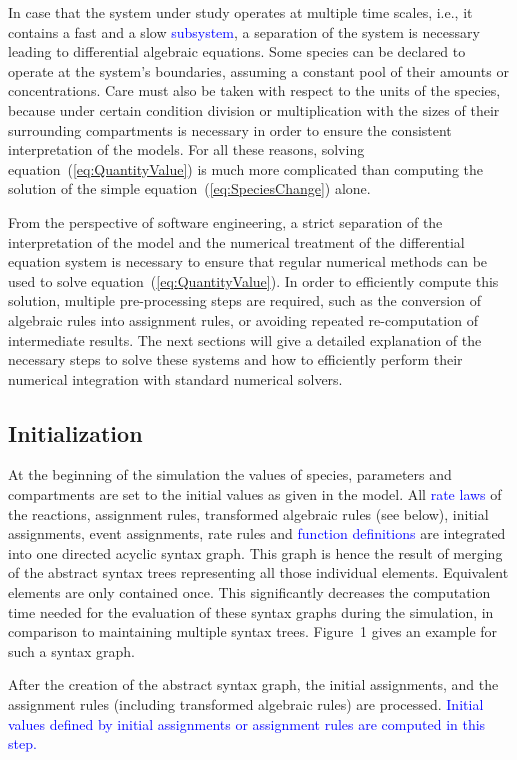 \documentclass[10pt]{bmc_article}
\newenvironment{bmcformat}{\fussy\setboolean{publ}{true}}{\fussy}
\newcommand{\COR}[1]{\textcolor{blue}{#1}}
\begin{document}
\begin{bmcformat}
In case that the system under study operates at multiple time scales, i.e., it
contains a fast and a slow \COR{subsystem}, a separation of the system is necessary
leading to differential algebraic equations.
Some species can be declared to operate at the system's boundaries, assuming a
constant pool of their amounts or concentrations.
Care must also be taken with respect to the units of the species, because under
certain condition division or multiplication with the sizes of their surrounding
compartments is necessary in order to ensure the consistent interpretation of
the models. 
For all these reasons, solving equation~(\ref{eq:QuantityValue}) is much more 
complicated than computing the solution of the simple equation~(\ref{eq:SpeciesChange})
alone.

From the perspective of software engineering, a strict separation of the 
interpretation of the model and the numerical treatment of the differential
equation system is necessary to ensure that regular numerical methods can be used
to solve equation~(\ref{eq:QuantityValue}).
In order to efficiently compute this solution, multiple pre-processing steps are
required, such as the conversion of algebraic rules into assignment rules, or
avoiding repeated re-computation of intermediate results.
The next sections will give a detailed explanation of the necessary steps to
solve these systems and how to efficiently perform their numerical integration
with standard numerical solvers.


\subsection*{Initialization}

At the beginning of the simulation the values of species, parameters and compartments are set to the initial values as given in the model.
All \COR{rate laws} of the reactions, assignment rules, transformed algebraic rules (see below), initial assignments, event assignments, rate rules and \COR{function definitions} are integrated into one directed acyclic syntax graph. This graph is hence the result of merging of the abstract syntax trees representing all those individual elements. Equivalent elements are only contained once. This significantly decreases the computation time needed for the evaluation of these syntax graphs during the simulation, in comparison to maintaining multiple syntax trees.
Figure~1 gives an example for such a syntax graph.

After the creation of the abstract syntax graph, the initial assignments, and the
assignment rules (including transformed algebraic rules) are processed.
\COR{Initial values defined by initial assignments or assignment rules are computed in this step.}



\end{bmcformat}
\end{document}
